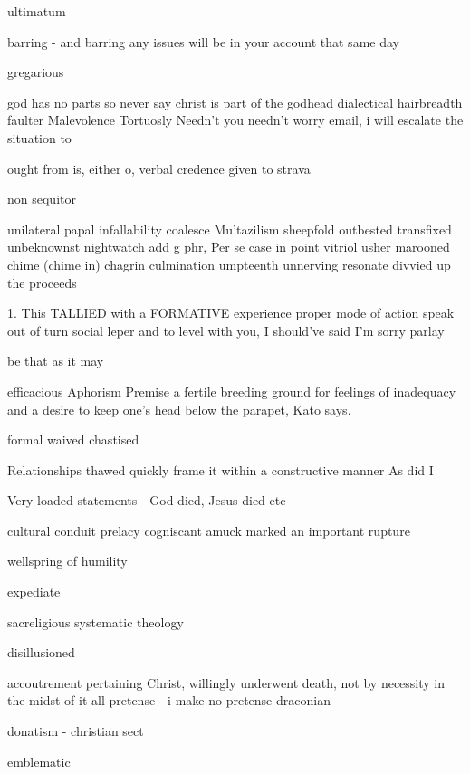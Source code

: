 ultimatum

barring - and barring any issues will be in your account that same day

gregarious

god has no parts so never say christ is part of the godhead
dialectical
hairbreadth
faulter
Malevolence
Tortuosly
Needn't you needn't worry
email, i will escalate the situation to

ought from is, either o, verbal credence given to
strava

non sequitor

unilateral papal infallability
coalesce
Mu'tazilism
sheepfold
outbested
transfixed
unbeknownst
nightwatch
add g phr,
Per se
case in point
vitriol
usher
marooned
chime (chime in)
chagrin
culmination
umpteenth
unnerving
resonate
divvied up the proceeds

1. This TALLIED with a FORMATIVE experience
proper mode of action
speak out of turn
social leper
and to level with you, I should've said I'm sorry
parlay

be that as it may

efficacious
Aphorism
Premise
 a fertile breeding ground for feelings of inadequacy and a desire to keep one’s head below the parapet, Kato says.

formal
waived
chastised

Relationships thawed
quickly frame it within a constructive manner
As did I

Very loaded statements - God died, Jesus died etc


cultural conduit
prelacy
cogniscant
amuck
marked an important rupture

wellspring of humility

expediate

sacreligious
systematic theology

disillusioned

accoutrement
pertaining
Christ, willingly underwent death, not by necessity
in the midst of it all
pretense - i make no pretense
draconian

donatism - christian sect

emblematic

